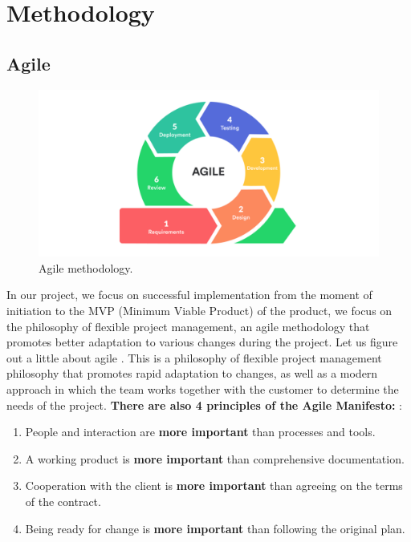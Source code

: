 \chapter{Methodology}\label{ch:B}
\section{Agile}\label{agile}
\begin{figure}[ht]\label{fig:agile}
  \centering
  \includegraphics[width=0.8\linewidth]{figures/agile.png}
  \caption{Agile methodology.}
\end{figure}
\vspace{0.5cm}

In our project, we focus on successful implementation from the moment of initiation to the MVP (Minimum Viable Product) \cite{mvp} of the product, we focus on the philosophy of flexible project management, an agile methodology \cite{agile} that promotes better adaptation to various changes during the project. 
Let us figure out a little about agile \cite{agile}. This is a philosophy of flexible project management philosophy that promotes rapid adaptation to changes, as well as a modern approach in which the team works together with the customer to determine the needs of the project. \textbf{There are also 4 principles of the Agile Manifesto:} \cite{agilemanifesto}:

\begin{enumerate}
\item People and interaction are \textbf{more important} than processes and tools.
\item A working product is \textbf{more important} than comprehensive documentation.
\item Cooperation with the client is \textbf{more important} than agreeing on the terms of the contract.
\item Being ready for change is \textbf{more important} than following the original plan. 
\end{enumerate}

